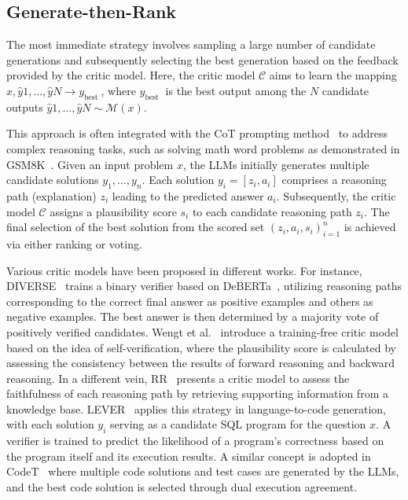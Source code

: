 \documentclass[a4paper,oneside]{book}
\begin{document}
\subsection{Generate-then-Rank}
The most immediate strategy involves sampling a large number of candidate generations and subsequently selecting the best generation based on the feedback provided by the critic model. Here, the critic model $\mathcal{C}$ aims to learn the mapping $x, \hat{y}{1}, \ldots, \hat{y}{N} \rightarrow y_{\text {best }}$, where $y_{\text {best }}$ is the best output among the $N$ candidate outputs $\hat{y}{1}, \ldots, \hat{y}{N} \sim \mathcal{M}(x)$.

This approach is often integrated with the CoT prompting method~\cite{wei2023chainofthought} to address complex reasoning tasks, such as solving math word problems as demonstrated in GSM8K~\cite{cobbe2021training}. Given an input problem $x$, the LLMs initially generates multiple candidate solutions $y_{1}, \ldots, y_{n}$. Each solution $y_{i}=\left[z_{i}, a_{i}\right]$ comprises a reasoning path (explanation) $z_{i}$ leading to the predicted answer $a_{i}$. Subsequently, the critic model $\mathcal{C}$ assigns a plausibility score $s_{i}$ to each candidate reasoning path $z_{i}$. The final selection of the best solution from the scored set $\left(z_{i}, a_{i}, s_{i}\right)_{i=1}^{n}$ is achieved via either ranking or voting.

Various critic models have been proposed in different works. For instance, DIVERSE~\cite{li-etal-2023-making} trains a binary verifier based on DeBERTa~\cite{he2021deberta}, utilizing reasoning paths corresponding to the correct final answer as positive examples and others as negative examples. The best answer is then determined by a majority vote of positively verified candidates. Wengt et al.~\cite{weng2023large} introduce a training-free critic model based on the idea of self-verification, where the plausibility score is calculated by assessing the consistency between the results of forward reasoning and backward reasoning. In a different vein, RR~\cite{he2022rethinking} presents a critic model to assess the faithfulness of each reasoning path by retrieving supporting information from a knowledge base. LEVER~\cite{ni2023lever} applies this strategy in language-to-code generation, with each solution $y_{i}$ serving as a candidate SQL program for the question $x$. A verifier is trained to predict the likelihood of a program's correctness based on the program itself and its execution results. A similar concept is adopted in CodeT~\cite{chen2022codet} where multiple code solutions and test cases are generated by the LLMs, and the best code solution is selected through dual execution agreement.
\end{document}
